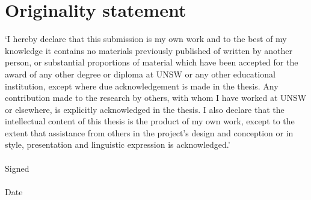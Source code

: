 \chapter*{Originality statement}
`I hereby declare that this submission is my own work and to the best of my knowledge it contains
 no materials previously published of written by another person, or substantial proportions of 
material which have been accepted for the award of any other degree or diploma at UNSW or any other
 educational institution, except where due acknowledgement is made in the thesis. Any contribution 
made to the research by others, with whom I have worked at UNSW or elsewhere, is explicitly 
acknowledged in the thesis. I also declare that the intellectual content of this thesis is the product
 of my own work, except to the extent that assistance from others in the project's design and 
conception or in style, presentation and linguistic expression is acknowledged.'\\\\
Signed \dotfill\\\\
Date \dotfill
